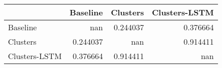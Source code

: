 \begin{tabular}{lrrr}
\toprule
               &   Baseline &   Clusters &   Clusters-LSTM \\
\midrule
 Baseline      & nan        &   0.244037 &        0.376664 \\
 Clusters      &   0.244037 & nan        &        0.914411 \\
 Clusters-LSTM &   0.376664 &   0.914411 &      nan        \\
\bottomrule
\end{tabular}